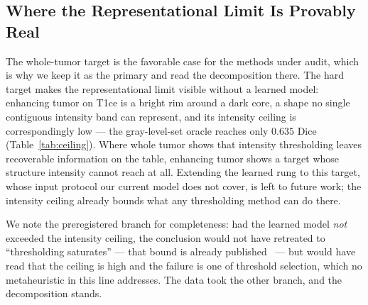 \subsection{Where the Representational Limit Is Provably Real}

The whole-tumor target is the favorable case for the methods under audit, which
is why we keep it as the primary and read the decomposition there. The hard
target makes the representational limit visible without a learned model:
enhancing tumor on T1ce is a bright rim around a dark core, a shape no single
contiguous intensity band can represent, and its intensity ceiling is
correspondingly low --- the gray-level-set oracle reaches only $0.635$ Dice
(Table~\ref{tab:ceiling}). Where whole tumor shows that intensity thresholding
leaves recoverable information on the table, enhancing tumor shows a target whose
structure intensity cannot reach at all. Extending the learned rung to this
target, whose input protocol our current model does not cover, is left to future
work; the intensity ceiling already bounds what any thresholding method can do
there.

We note the preregistered branch for completeness: had the learned model
\emph{not} exceeded the intensity ceiling, the conclusion would not have
retreated to ``thresholding saturates'' --- that bound is already
published~\cite{francois_jmiv} --- but would have read that the ceiling is high
and the failure is one of threshold selection, which no metaheuristic in this
line addresses. The data took the other branch, and the decomposition stands.
